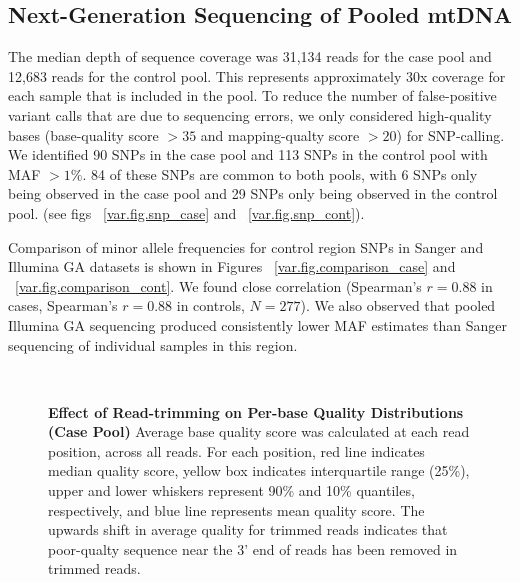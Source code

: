\subsection{Next-Generation Sequencing of Pooled mtDNA}\label{var.results.illumina_sequencing}
The median depth of sequence coverage was 31,134 reads for the case pool and 12,683 reads for the control pool.  This represents approximately 30x coverage for each sample that is included in the pool.  To reduce the number of false-positive variant calls that are due to sequencing errors, we only considered high-quality bases (base-quality score $> 35$ and mapping-qualty score $> 20$) for SNP-calling.  We identified 90 SNPs in the case pool and 113 SNPs in the control pool with MAF $> 1\%$. 84 of these SNPs are common to both pools, with 6 SNPs only being observed in the case pool and 29 SNPs only being observed in the control pool. (see figs ~\ref{var.fig.snp_case} and ~\ref{var.fig.snp_cont}).

Comparison of minor allele frequencies for control region SNPs in Sanger and Illumina GA datasets is shown in Figures ~\ref{var.fig.comparison_case} and ~\ref{var.fig.comparison_cont}.  We found close correlation (Spearman's $r = 0.88$ in cases, Spearman's $r = 0.88$ in controls, $N = 277$).  We also observed that pooled Illumina GA sequencing produced consistently lower MAF estimates than Sanger sequencing of individual samples in this region.

\begin{figure}
  \begin{center}
   \\
  \end{center}
  \caption[Per-base Quality Distributions]{
    \small{\textbf{Effect of Read-trimming on Per-base Quality Distributions (Case Pool)} Average base quality score was calculated at each read position, across all reads.  For each position, red line indicates median quality score, yellow box indicates interquartile range (25\%), upper and lower whiskers represent 90\% and 10\% quantiles, respectively, and blue line represents mean quality score. The upwards shift in average quality for trimmed reads indicates that poor-qualty sequence near the 3' end of reads has been removed in trimmed reads. }}
  \label{var.fig.base_quality_case}
\end{figure}

